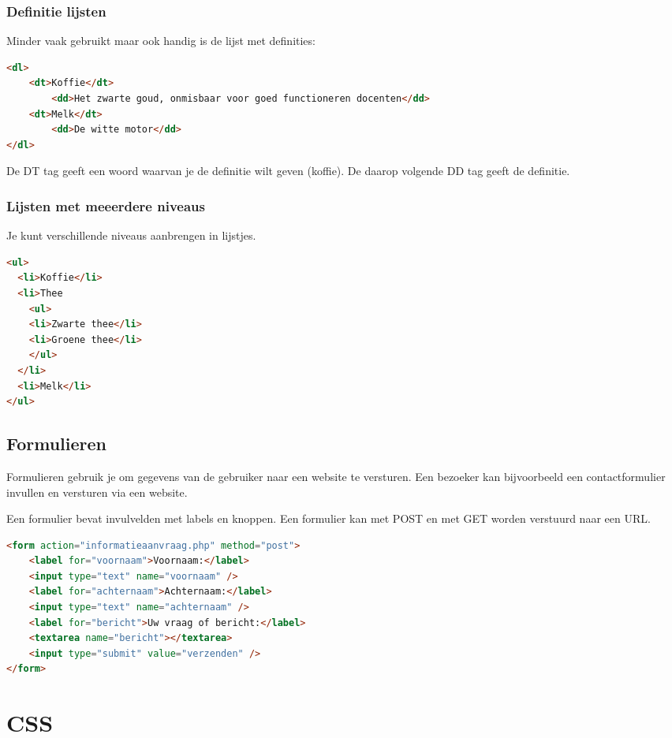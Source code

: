 \documentclass[8pt,pagesize,footinclude=false,headinclude=false]{scrartcl}
\begin{document}
\begin{multicols*}{4}
\subsubsection*{Definitie lijsten}
Minder vaak gebruikt maar ook handig is de lijst met definities:
\begin{lstlisting}[language=HTML]
<dl>
	<dt>Koffie</dt>
		<dd>Het zwarte goud, onmisbaar voor goed functioneren docenten</dd>
	<dt>Melk</dt>
		<dd>De witte motor</dd>
</dl>
\end{lstlisting}
\noindent De DT tag geeft een woord waarvan je de definitie wilt geven (koffie). De daarop volgende DD tag geeft de definitie.

\subsubsection*{Lijsten met meeerdere niveaus}
Je kunt verschillende niveaus aanbrengen in lijstjes.

\begin{lstlisting}[language=HTML]
<ul>
  <li>Koffie</li>
  <li>Thee
    <ul>
    <li>Zwarte thee</li>
    <li>Groene thee</li>
    </ul>
  </li>
  <li>Melk</li>
</ul>
\end{lstlisting}

\subsection*{Formulieren}
Formulieren gebruik je om gegevens van de gebruiker naar een website te versturen. Een bezoeker kan bijvoorbeeld een contactformulier invullen en versturen via een website.

Een formulier bevat invulvelden met labels en knoppen. Een formulier kan met POST en met GET worden verstuurd naar een URL.

\begin{lstlisting}[language=HTML]
<form action="informatieaanvraag.php" method="post">
	<label for="voornaam">Voornaam:</label>
	<input type="text" name="voornaam" />
	<label for="achternaam">Achternaam:</label>
	<input type="text" name="achternaam" />
	<label for="bericht">Uw vraag of bericht:</label>
	<textarea name="bericht"></textarea>
	<input type="submit" value="verzenden" />
</form>
\end{lstlisting}

\clearpage

\section*{CSS}

\end{multicols*}
\end{document}
